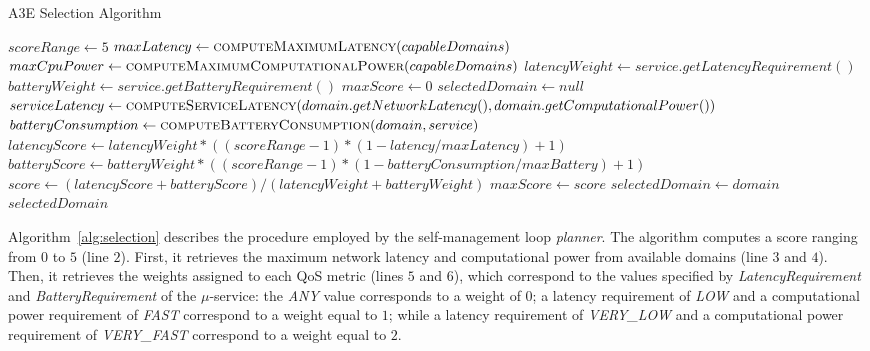 \setlength{\textfloatsep}{5pt}%
{\scriptsize
\begin{algorithm}[th]
	\caption{A3E Selection Algorithm}
	\label{alg:selection}
	\begin{algorithmic}[1]		
		\State $scoreRange \gets 5$
		\State $maxLatency \gets \Call{computeMaximumLatency}{capableDomains}$
		\State $maxCpuPower \gets \Call{computeMaximumComputationalPower}{capableDomains}$
		\State $latencyWeight \gets service.getLatencyRequirement()$
		\State $batteryWeight \gets service.getBatteryRequirement()$
		\State $maxScore \gets 0$
		\State $selectedDomain \gets null$
		\State $serviceLatency \gets 
		\Call{computeServiceLatency}{domain.getNetworkLatency(),domain.getComputationalPower()}$
		\State $batteryConsumption \gets%
		\Call{computeBatteryConsumption}{domain, service}$
		\State $latencyScore \gets latencyWeight*((scoreRange-1)*(1 - latency/maxLatency)+1)$ 		
		\State $batteryScore \gets batteryWeight*((scoreRange-1)*(1 - batteryConsumption/maxBattery)+1)$ 
		\State $score \gets (latencyScore + batteryScore) / (latencyWeight + batteryWeight)$
		\State $maxScore \gets score$
		\State $selectedDomain \gets domain$
		\EndIf
		\EndFor 
		\State \Return $selectedDomain$
		\EndFunction
	\end{algorithmic}
\end{algorithm}
}%

Algorithm~\ref{alg:selection} describes the procedure employed by the self-management loop \textit{planner}. The algorithm computes a score ranging from $0$ to $5$ (line $2$). First, it retrieves the maximum network latency and computational power from available domains (line $3$ and $4$). Then, it retrieves the weights assigned to each QoS metric (lines $5$ and $6$), which correspond to  the values specified by \textit{LatencyRequirement} and \textit{BatteryRequirement} of the $\mu$-service: the \textit{ANY} value corresponds to a weight of $0$; a latency requirement of \textit{LOW} and a computational power requirement of \textit{FAST} correspond to a weight equal to $1$; while a latency requirement of \textit{VERY\_LOW} and a computational power requirement of \textit{VERY\_FAST} correspond to a weight equal to $2$. 

